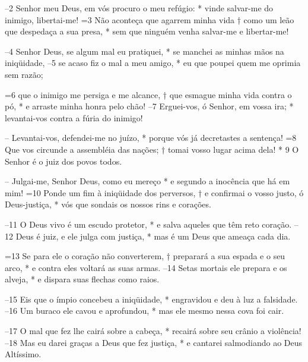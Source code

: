 –2 Senhor meu Deus, em vós procuro o meu refúgio: *
vinde salvar-me do inimigo, libertai-me! 
=3 Não aconteça que agarrem minha vida †
como um leão que despedaça a sua presa, *
sem que ninguém venha salvar-me e libertar-me!

–4 Senhor Deus, se algum mal eu pratiquei, *
se manchei as minhas mãos na iniqüidade, 
–5 se acaso fiz o mal a meu amigo, *
eu que poupei quem me oprimia sem razão;

=6 que o inimigo me persiga e me alcance, †
que esmague minha vida contra o pó, *
e arraste minha honra pelo chão! 
–7 Erguei-vos, ó Senhor, em vossa ira; *
levantai-vos contra a fúria do inimigo!

– Levantai-vos, defendei-me no juízo, *
porque vós já decretastes a sentença! 
=8 Que vos circunde a assembléia das nações; †
tomai vosso lugar acima dela! * 
9 O Senhor é o juiz dos povos todos.

– Julgai-me, Senhor Deus, como eu mereço *
e segundo a inocência que há em mim! 
=10 Ponde um fim à iniqüidade dos perversos, †
e confirmai o vosso justo, ó Deus-justiça, *
vós que sondais os nossos rins e corações.

–11 O Deus vivo é um escudo protetor, *
e salva aqueles que têm reto coração. 
–12 Deus é juiz, e ele julga com justiça, *
mas é um Deus que ameaça cada dia.

=13 Se para ele o coração não converterem, †
preparará a sua espada e o seu arco, *
e contra eles voltará as suas armas. 
–14 Setas mortais ele prepara e os alveja, *
e dispara suas flechas como raios.

–15 Eis que o ímpio concebeu a iniqüidade, *
engravidou e deu à luz a falsidade. 
–16 Um buraco ele cavou e aprofundou, *
mas ele mesmo nessa cova foi cair.

–17 O mal que fez lhe cairá sobre a cabeça, *
recairá sobre seu crânio a violência! 
–18 Mas eu darei graças a Deus que fez justiça, *
e cantarei salmodiando ao Deus Altíssimo.